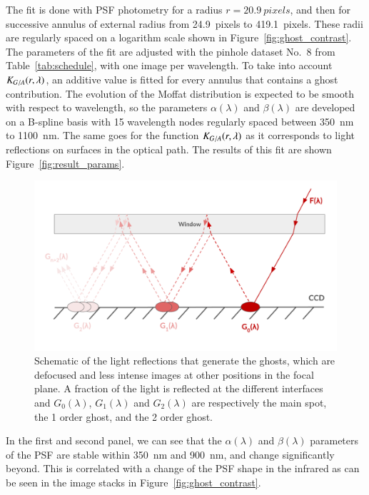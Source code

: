 The fit is done with PSF photometry for a radius $r=\SI{20.9}{pixels}$, and then for successive annulus of external radius from \SI{24.9}{pixels} to \SI{419.1}{pixels}. These radii are regularly spaced on a logarithm scale shown in Figure~\ref{fig:ghost_contrast}. The parameters of the fit are adjusted with the \spinhole pinhole dataset No.~8 from Table~\ref{tab:schedule}, with one image per wavelength. To take into account $K_{G/A}(r, \lambda)$, an additive value is fitted for every annulus that contains a ghost contribution. The evolution of the Moffat distribution is expected to be smooth with respect to wavelength, so the parameters $\alpha(\lambda)$ and $\beta(\lambda)$ are developed on a B-spline basis with 15 wavelength nodes regularly spaced between \SI{350}{\nano\meter} to \SI{1100}{\nano\meter}. The same goes for the function $K_{G/A}(r, \lambda)$ as it corresponds to light reflections on surfaces in the optical path. The results of this fit are shown Figure~\ref{fig:result_params}. 

\begin{figure}[h]
    \centering
    \includegraphics[width=\columnwidth]{fig/schema_ghost.pdf}
    \caption{Schematic of the light reflections that generate the ghosts, which are defocused and less intense images at other positions in the focal plane. A fraction of the light is reflected at the different interfaces and $G_0(\lambda)$, $G_1(\lambda)$ and $G_2(\lambda)$ are respectively the main spot, the 1 order ghost, and the 2 order ghost.}
    \label{fig:schema_ghost}
\end{figure}

In the first and second panel, we can see that the $\alpha(\lambda)$ and $\beta(\lambda)$ parameters of the PSF are stable within \SI{350}{\nano\meter} and \SI{900}{\nano\meter}, and change significantly beyond. This is correlated with a change of the PSF shape in the infrared as can be seen in the image stacks in Figure~\ref{fig:ghost_contrast}. 

